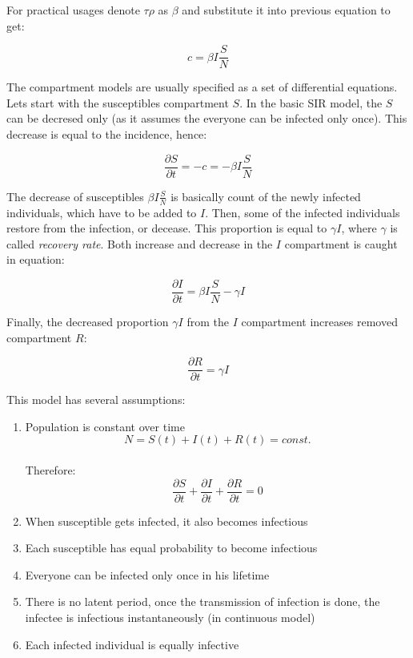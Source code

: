 \documentclass[
  digital, %
  oneside, %
  lof,     %
  lot,     %
]{fithesis4}
\begin{document}
For practical usages denote $\tau \rho$ as $\beta$ 
and substitute it into previous equation to get:

\begin{equation}
	c = \beta I \frac{S}{N}
\end{equation}

The compartment models are usually specified as a set of
differential equations. Lets start with the susceptibles
compartment $S$. In the basic SIR model, the $S$
can be decresed only (as it assumes the everyone can be 
infected only once).
This decrease is equal to the incidence, hence:

\begin{equation}\label{eq:sir-model-incidence}
	\frac{\partial{S}}{\partial{t}} = -c = -\beta I \frac{S}{N}
\end{equation}

The decrease of susceptibles $\beta I \frac{S}{N}$ is basically 
count of the newly infected individuals, which have 
to be added to $I$. 
Then, some of the infected individuals restore from 
the infection, or decease. 
This proportion is equal to $\gamma I$, where $\gamma$ 
is called \textit{recovery rate}. Both increase and decrease in 
the $I$ compartment is caught in equation:

\begin{equation}\label{eq:sir-model-partial-I}
	\frac{\partial{I}}{\partial{t}} = \beta I \frac{S}{N} - \gamma I
\end{equation}

Finally, the decreased proportion $\gamma I$ from the 
$I$ compartment increases removed compartment $R$:

\begin{equation}
	\frac{\partial{R}}{\partial{t}} = \gamma I
\end{equation}

This model has several assumptions:

\begin{enumerate}
  \item Population is constant over time \\
    \begin{equation}
      N = S(t) + I(t) + R(t) = const.
    \end{equation} \\
    Therefore: \\
    \begin{equation}
      \frac{\partial{S}}{\partial{t}} + \frac{\partial{I}}{\partial{t}} + \frac{\partial{R}}{\partial{t}} = 0
    \end{equation}
  \item When susceptible gets infected, it also becomes infectious
  \item Each susceptible has equal probability to become infectious
  \item Everyone can be infected only once in his lifetime
  \item There is no latent period, once the transmission of infection is done, the infectee is infectious instantaneously (in continuous model)
  \item Each infected individual is equally infective \cite{volz2018}
\end{enumerate}
\end{document}
